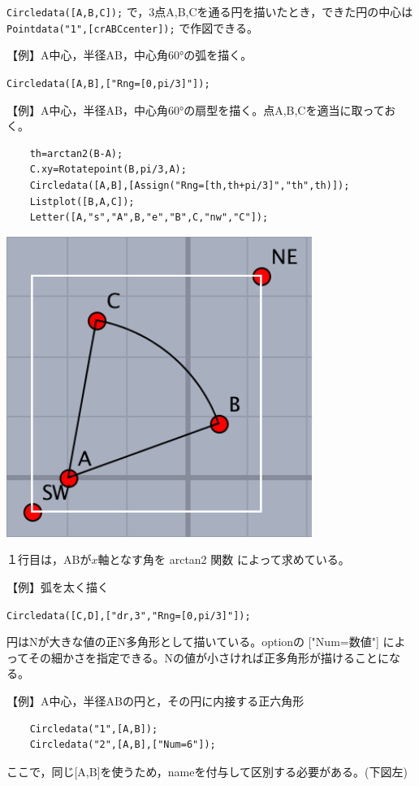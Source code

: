 \documentclass[papersize,a4paper,12pt,uplatex]{jsarticle}
\begin{document}
\begin{description}
 \verb|Circledata([A,B,C]);| で，3点A,B,Cを通る円を描いたとき，できた円の中心は   \verb|Pointdata("1",[crABCcenter]);| で作図できる。
 
\vspace{\baselineskip}
【例】A中心，半径AB，中心角60°の弧を描く。

\hspace{10mm}  \verb|Circledata([A,B],["Rng=[0,pi/3]"]); |

\vspace{\baselineskip}
【例】A中心，半径AB，中心角60°の扇型を描く。点A,B,Cを適当に取っておく。
  
\begin{verbatim}
    th=arctan2(B-A);
    C.xy=Rotatepoint(B,pi/3,A);
    Circledata([A,B],[Assign("Rng=[th,th+pi/3]","th",th)]);
    Listplot([B,A,C]); 
    Letter([A,"s","A",B,"e","B",C,"nw","C"]);
\end{verbatim}

\begin{center}
\includegraphics[bb=0.00 0.00 180.01 177.01,width=4cm"] {Fig/circledata3.pdf}\hspace{12mm}  
\end{center}

１行目は，ABが$x$軸となす角を arctan2 関数 によって求めている。

\vspace{\baselineskip}
【例】弧を太く描く

    \verb|Circledata([C,D],["dr,3","Rng=[0,pi/3]"]);|

  円はNが大きな値の正N多角形として描いている。optionの ["Num=数値"] によってその細かさを指定できる。Nの値が小さければ正多角形が描けることになる。

\vspace{\baselineskip}
【例】A中心，半径ABの円と，その円に内接する正六角形
\begin{verbatim}
    Circledata("1",[A,B]);
    Circledata("2",[A,B],["Num=6"]);
\end{verbatim}
ここで，同じ[A,B]を使うため，nameを付与して区別する必要がある。(下図左)


\end{description}
\end{document}
